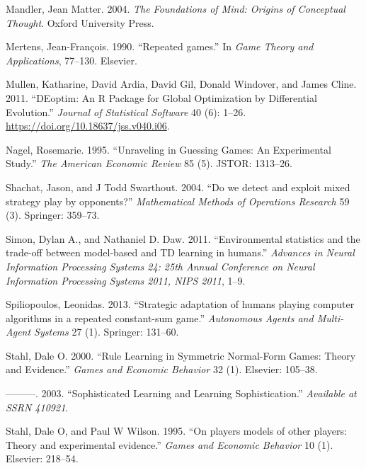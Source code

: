 \documentclass[smallextended]{svjour3}       %
\begin{document}
\leavevmode\hypertarget{ref-mandler2004foundations}{}%
Mandler, Jean Matter. 2004. \emph{The Foundations of Mind: Origins of
Conceptual Thought}. Oxford University Press.

\leavevmode\hypertarget{ref-mertens1990repeated}{}%
Mertens, Jean-François. 1990. ``Repeated games.'' In \emph{Game Theory
and Applications}, 77--130. Elsevier.

\leavevmode\hypertarget{ref-R-DEoptim}{}%
Mullen, Katharine, David Ardia, David Gil, Donald Windover, and James
Cline. 2011. ``DEoptim: An R Package for Global Optimization by
Differential Evolution.'' \emph{Journal of Statistical Software} 40 (6):
1--26. \url{https://doi.org/10.18637/jss.v040.i06}.

\leavevmode\hypertarget{ref-nagel1995unraveling}{}%
Nagel, Rosemarie. 1995. ``Unraveling in Guessing Games: An Experimental
Study.'' \emph{The American Economic Review} 85 (5). JSTOR: 1313--26.

\leavevmode\hypertarget{ref-shachat2004we}{}%
Shachat, Jason, and J Todd Swarthout. 2004. ``Do we detect and exploit
mixed strategy play by opponents?'' \emph{Mathematical Methods of
Operations Research} 59 (3). Springer: 359--73.

\leavevmode\hypertarget{ref-Simon_Daw_11}{}%
Simon, Dylan A., and Nathaniel D. Daw. 2011. ``Environmental statistics
and the trade-off between model-based and TD learning in humans.''
\emph{Advances in Neural Information Processing Systems 24: 25th Annual
Conference on Neural Information Processing Systems 2011, NIPS 2011},
1--9.

\leavevmode\hypertarget{ref-spiliopoulos2013strategic}{}%
Spiliopoulos, Leonidas. 2013. ``Strategic adaptation of humans playing
computer algorithms in a repeated constant-sum game.'' \emph{Autonomous
Agents and Multi-Agent Systems} 27 (1). Springer: 131--60.

\leavevmode\hypertarget{ref-stahl2000rule}{}%
Stahl, Dale O. 2000. ``Rule Learning in Symmetric Normal-Form Games:
Theory and Evidence.'' \emph{Games and Economic Behavior} 32 (1).
Elsevier: 105--38.

\leavevmode\hypertarget{ref-stahl2003sophisticated}{}%
---------. 2003. ``Sophisticated Learning and Learning Sophistication.''
\emph{Available at SSRN 410921}.

\leavevmode\hypertarget{ref-stahl1995players}{}%
Stahl, Dale O, and Paul W Wilson. 1995. ``On players models of other
players: Theory and experimental evidence.'' \emph{Games and Economic
Behavior} 10 (1). Elsevier: 218--54.
\end{document}
